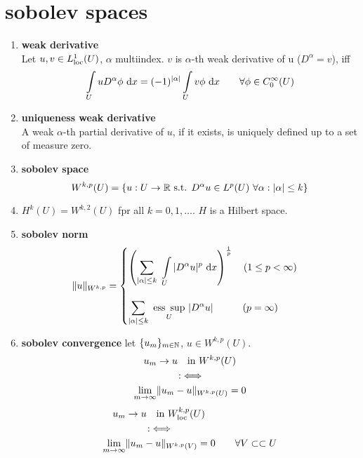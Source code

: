 \section{sobolev spaces}


\begin{enumerate}[label=(\alph*)]
	\item \textbf{weak derivative}\\
	Let $u,v \in L^1_{\text{loc}}(U)$, $\alpha$ multiindex. $v$ is $\alpha$-th weak derivative of u ($D^{\alpha} = v$), iff
	\begin{equation*}
	\int \limits_U u D^{\alpha}\phi \text{ d} x = (-1)^{|\alpha|} \int \limits_U v\phi \text{ d} x \qquad \forall \phi \in C^\infty_0(U)
	\end{equation*}
	
	\item \textbf{uniqueness weak derivative}\\
	A weak  $\alpha$-th partial derivative of $u$, if it exists, is uniquely defined up to a set of measure zero.
	
	\item \textbf{sobolev space}\\
	\begin{equation*}
		W^{k,p}(U) = \{ u: U \to \mathbb{R} \text{ s.t. } D^{\alpha}u \in L^p(U)\  \forall \alpha: |\alpha| \leq k \}
	\end{equation*}
	\item $H^k(U) = W^{k,2}(U)$ fpr all $k = 0,1,\dots$. $H$ is a Hilbert space.
	
	\item \textbf{sobolev norm}
	\begin{equation*}
		\|u\|_{W^{k,p}} = 
		\begin{cases}
		\left( \displaystyle \sum_{|\alpha|\leq k}\  \int \limits_U |D^{\alpha}u|^p  \text{ d} x \right)^{\frac{1}{p}} \quad (1 \leq p< \infty)\\
		\\
		\displaystyle \sum_{|\alpha|\leq k}\  \underset{U}{\text{ess }\sup}\  |D^{\alpha}u| \qquad \quad  (p = \infty)
		\end{cases}
	\end{equation*}
	
	\item \textbf{sobolev convergence}
	let $\{u_m\}_{m\in \mathbb{N}}$, $u \in W^{k,p}(U)$. 
	\begin{align*}
		& \quad u_m \to u \quad \text{in } W^{k,p}(U)\\
		& \hspace{1.5cm}:\iff \\
		&\underset{m \to \infty}{\lim} \|u_m -u\|_{W^{k,p}(U)} = 0
	\end{align*}
	\begin{align*}
	& \quad u_m \to u \quad \text{in } W^{k,p}_{\text{loc}}(U)\\
	& \hspace{1.5cm}:\iff \\
	&\underset{m \to \infty}{\lim} \|u_m -u\|_{W^{k,p}(V)} = 0 \qquad \forall V \subset\subset U
	\end{align*}
\end{enumerate}